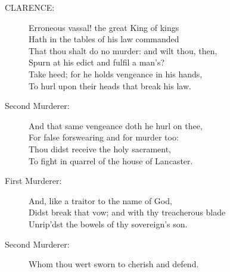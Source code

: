 \documentclass{article}
\begin{document}
\begin{description}
\item[CLARENCE:] 
\hspace{1pt}Erroneous vassal! the great King of kings\\
\hspace{1pt}Hath in the tables of his law commanded\\
\hspace{1pt}That thou shalt do no murder: and wilt thou, then,\\
\hspace{1pt}Spurn at his edict and fulfil a man's?\\
\hspace{1pt}Take heed; for he holds vengeance in his hands,\\
\hspace{1pt}To hurl upon their heads that break his law.\\
\end{description}
\begin{description}
\item[Second Murderer:] 
\hspace{1pt}And that same vengeance doth he hurl on thee,\\
\hspace{1pt}For false forswearing and for murder too:\\
\hspace{1pt}Thou didst receive the holy sacrament,\\
\hspace{1pt}To fight in quarrel of the house of Lancaster.\\
\end{description}
\begin{description}
\item[First Murderer:] 
\hspace{1pt}And, like a traitor to the name of God,\\
\hspace{1pt}Didst break that vow; and with thy treacherous blade\\
\hspace{1pt}Unrip'dst the bowels of thy sovereign's son.\\
\end{description}
\begin{description}
\item[Second Murderer:] 
\hspace{1pt}Whom thou wert sworn to cherish and defend.\\
\end{description}
\end{document}
